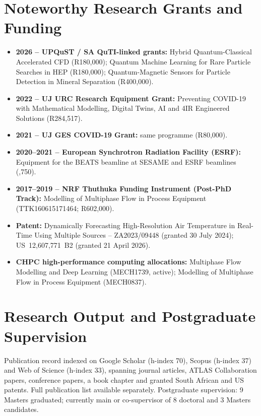 \documentclass[11pt, a4paper]{article}
\begin{document}
\section{Noteworthy Research Grants and Funding}
\begin{itemize}
  \item \textbf{2026 -- UPQuST / SA QuTI-linked grants:} Hybrid Quantum-Classical Accelerated CFD (R180,000); Quantum Machine Learning for Rare Particle Searches in HEP (R180,000); Quantum-Magnetic Sensors for Particle Detection in Mineral Separation (R400,000).
  \item \textbf{2022 -- UJ URC Research Equipment Grant:} Preventing COVID-19 with Mathematical Modelling, Digital Twins, AI and 4IR Engineered Solutions (R284,517).
  \item \textbf{2021 -- UJ GES COVID-19 Grant:} same programme (R80,000).
  \item \textbf{2020--2021 -- European Synchrotron Radiation Facility (ESRF):} Equipment for the BEATS beamline at SESAME and ESRF beamlines (,750).
  \item \textbf{2017--2019 -- NRF Thuthuka Funding Instrument (Post-PhD Track):} Modelling of Multiphase Flow in Process Equipment (TTK160615171464; R602,000).
  \item \textbf{Patent:} Dynamically Forecasting High-Resolution Air Temperature in Real-Time Using Multiple Sources -- ZA2023/09448 (granted 30 July 2024); US~12,607,771~B2 (granted 21 April 2026).
  \item \textbf{CHPC high-performance computing allocations:} Multiphase Flow Modelling and Deep Learning (MECH1739, active); Modelling of Multiphase Flow in Process Equipment (MECH0837).
\end{itemize}

\section{Research Output and Postgraduate Supervision}
Publication record indexed on Google Scholar (h-index 70), Scopus (h-index 37) and Web of Science (h-index 33), spanning journal articles, ATLAS Collaboration papers, conference papers, a book chapter and granted South African and US patents. Full publication list available separately. Postgraduate supervision: 9 Masters graduated; currently main or co-supervisor of 8 doctoral and 3 Masters candidates.

\end{document}
